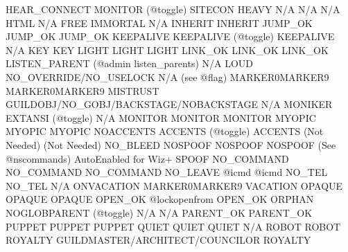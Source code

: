 \documentclass[letterpaper,10pt,english]{sphinxmanual}
\begin{document}
\begin{description}
HEAR\_CONNECT            MONITOR (@toggle)                      SITECON
HEAVY                                     N/A
N/A                     N/A                                    HTML
N/A                     FREE                                   IMMORTAL
N/A                     INHERIT                                INHERIT
JUMP\_OK                 JUMP\_OK                                JUMP\_OK
KEEPALIVE               KEEPALIVE (@toggle)                    KEEPALIVE
N/A                     KEY                                    KEY
LIGHT                   LIGHT                                  LIGHT
LINK\_OK                 LINK\_OK                                LINK\_OK
LISTEN\_PARENT           (@admin listen\_parents)                N/A
LOUD                    NO\_OVERRIDE/NO\_USELOCK                 N/A
(see @flag)             MARKER0\sphinxhyphen{}MARKER9                        MARKER0\sphinxhyphen{}MARKER9
MISTRUST                GUILDOBJ/NO\_GOBJ/BACKSTAGE/NOBACKSTAGE N/A
MONIKER                 EXTANSI (@toggle)                      N/A
MONITOR                 MONITOR                                MONITOR
MYOPIC                  MYOPIC                                 MYOPIC
NOACCENTS               ACCENTS (@toggle)                      ACCENTS
(Not Needed)            (Not Needed)                           NO\_BLEED
NOSPOOF                 NOSPOOF                                NOSPOOF
(See @ns\sphinxhyphen{}commands)      Auto\sphinxhyphen{}Enabled for Wiz+                  SPOOF
NO\_COMMAND              NO\_COMMAND                             NO\_COMMAND
NO\_LEAVE                @icmd                 @icmd 
NO\_TEL                  NO\_TEL                                 N/A
ON\sphinxhyphen{}VACATION             MARKER0\sphinxhyphen{}MARKER9                        VACATION
OPAQUE                  OPAQUE                                 OPAQUE
OPEN\_OK                 @lock\sphinxhyphen{}openfrom                         OPEN\_OK
ORPHAN                  NOGLOBPARENT (@toggle)                 N/A
N/A                     PARENT\_OK                              PARENT\_OK
PUPPET                  PUPPET                                 PUPPET
QUIET                   QUIET                                  QUIET
N/A                     ROBOT                                  ROBOT
ROYALTY                 GUILDMASTER/ARCHITECT/COUNCILOR        ROYALTY

\end{description}
\end{document}
